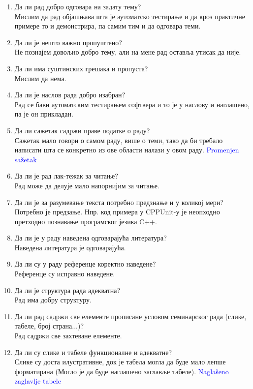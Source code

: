 \documentclass[a4paper]{report}
\newcommand{\odgovor}[1]{\textcolor{blue}{#1}}
\begin{document}
\begin{enumerate}
\item Да ли рад добро одговара на задату тему?\\
Мислим да рад објашњава шта је аутоматско тестирање и да кроз практичне примере то и демонстрира, па самим тим и да одговара теми.
\item Да ли је нешто важно пропуштено?\\
Не познајем довољно добро тему, али на мене рад оставља утисак да није.
\item Да ли има суштинских грешака и пропуста?\\
Мислим да нема.
\item Да ли је наслов рада добро изабран?\\
Рад се бави аутоматским тестирањем софтвера и то је у наслову и наглашено, па је он прикладан.
\item Да ли сажетак садржи праве податке о раду?\\
Сажетак мало говори о самом раду, више о теми, тако да би требало написати шта се конкретно из ове области налази у овом раду.
\odgovor{Promenjen sažetak}
\item Да ли је рад лак-тежак за читање?\\
Рад може да делује мало напорнијим за читање.
\item Да ли је за разумевање текста потребно предзнање и у коликој мери?\\
Потребно је предзање. Нпр. код примера у CPPUnit-у је неопходно претходно познавање програмског језика C++.
\item Да ли је у раду наведена одговарајућа литература?\\
Наведена литература је одговарајућа.
\item Да ли су у раду референце коректно наведене?\\
Референце су исправно наведене.
\item Да ли је структура рада адекватна?\\
Рад има добру структуру.
\item Да ли рад садржи све елементе прописане условом семинарског рада (слике, табеле, број страна...)?\\
Рад садржи све захтеване елементе.
\item Да ли су слике и табеле функционалне и адекватне?\\
Слике су доста илустративне, док је табела могла да буде мало лепше форматирана (Могло је да буде наглашено заглавље табеле).
\odgovor{Naglašeno zaglavlje tabele}
\end{enumerate}
\end{document}
